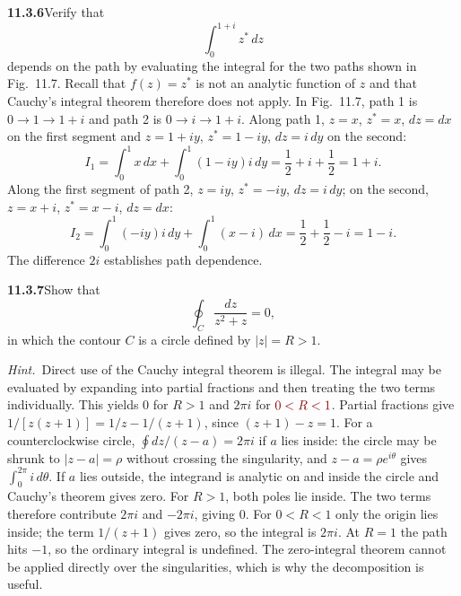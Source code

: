 \par\bigskip
\noindent\textbf{11.3.6}\quad Verify that
\[
\int_{0}^{1+i}z^{*}\,dz
\]
depends on the path by evaluating the integral for the two paths shown in
Fig.~11.7. Recall that $f(z)=z^{*}$ is not an analytic function of $z$ and
that Cauchy's integral theorem therefore does not apply.
\solution
In Fig.~11.7, path 1 is $0\to1\to1+i$ and path 2 is
$0\to i\to1+i$. Along path 1, $z=x$, $z^*=x$, $dz=dx$ on the first
segment and $z=1+iy$, $z^*=1-iy$, $dz=i\,dy$ on the second:
\[
I_1=\int_0^1x\,dx+\int_0^1(1-iy)i\,dy
=\frac12+i+\frac12=\boxed{1+i}.
\]
Along the first segment of path 2, $z=iy$, $z^*=-iy$, $dz=i\,dy$; on
the second, $z=x+i$, $z^*=x-i$, $dz=dx$:
\[
I_2=\int_0^1(-iy)i\,dy+\int_0^1(x-i)\,dx
=\frac12+\frac12-i=\boxed{1-i}.
\]
The difference $2i$ establishes path dependence.
\begin{center}
\end{center}

\par\bigskip
\noindent\textbf{11.3.7}\quad Show that
\[
\oint_{C}\frac{dz}{z^{2}+z}=0,
\]
in which the contour $C$ is a  circle defined by $|z|=R>1$.

\emph{Hint.}~Direct use of the Cauchy integral theorem is illegal. The
integral may be evaluated by expanding into partial fractions and then
treating the two terms individually. This yields $0$ for $R>1$ and $2\pi i$
for $\erratum{0<R<1}$.
\solution
Partial fractions give $1/[z(z+1)]=1/z-1/(z+1)$, since
$(z+1)-z=1$. For a counterclockwise circle, $\oint dz/(z-a)=2\pi i$ if
$a$ lies inside: the circle may be shrunk to $|z-a|=\rho$ without
crossing the singularity, and $z-a=\rho e^{i\theta}$ gives
$\int_0^{2\pi}i\,d\theta$. If $a$ lies outside, the integrand is
analytic on and inside the circle and Cauchy's theorem gives zero.
For $R>1$, both poles lie inside.
The two terms therefore contribute $2\pi i$ and $-2\pi i$,
giving $\boxed0$.
For $0<R<1$ only the origin lies inside; the term $1/(z+1)$ gives zero,
so the integral is $2\pi i$.
At $R=1$ the path hits $-1$, so the ordinary integral is undefined.
The zero-integral theorem cannot be applied directly over the
singularities, which is why the decomposition is useful.

